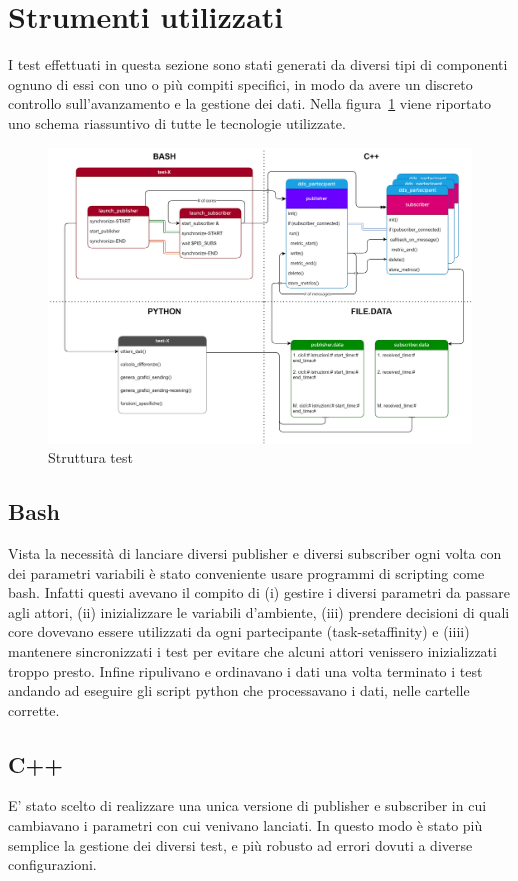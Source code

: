 \section{Strumenti utilizzati}%
I test effettuati in questa sezione sono stati generati da diversi tipi di componenti ognuno di essi con uno o più compiti specifici, in modo da avere un discreto controllo sull'avanzamento e la gestione dei dati. Nella figura~\ref{fig:schema_global} viene riportato uno schema riassuntivo di tutte le tecnologie utilizzate.
\begin{figure}[H]
    \centering
    \includegraphics[width=\textwidth]{./img/schema_test_globale.drawio.png}
    \caption{Struttura test}\label{fig:schema_global}
\end{figure}

\subsection{Bash}\label{sec:Shell}
Vista la necessità di lanciare diversi publisher e diversi subscriber ogni volta con dei parametri variabili è stato conveniente usare programmi di scripting come bash. Infatti questi avevano il compito di (i) gestire i diversi parametri da passare agli attori, (ii) inizializzare le variabili d'ambiente, (iii) prendere decisioni di quali core dovevano essere utilizzati da ogni partecipante (task-setaffinity) e (iiii) mantenere sincronizzati i test per evitare che alcuni attori venissero inizializzati troppo presto. Infine ripulivano e ordinavano i dati una volta terminato i test andando ad eseguire gli script python che processavano i dati, nelle cartelle corrette.
\subsection{C++}
E' stato scelto di realizzare una unica versione di publisher e subscriber in cui cambiavano i parametri con cui venivano lanciati. In questo modo è stato più semplice la gestione dei diversi test, e più robusto ad errori dovuti a diverse configurazioni.
